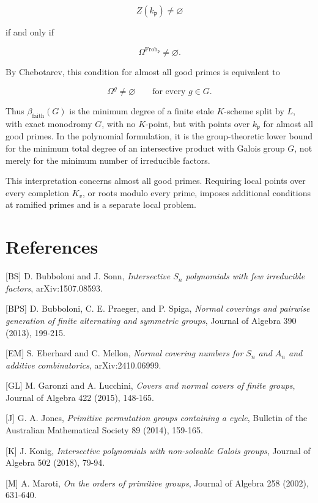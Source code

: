 \documentclass[11pt]{article}
\begin{document}
\[
Z(k_{\mathfrak p})\ne\varnothing
\]

if and only if

\[
\Omega^{\operatorname{Frob}_{\mathfrak p}}\ne\varnothing.
\]

By Chebotarev, this condition for almost all good primes is equivalent to

\[
\Omega^g\ne\varnothing
\qquad
\text{for every }g\in G.
\]

Thus $\beta_{\mathrm{faith}}(G)$ is the minimum degree of a finite etale $K$-scheme split by $L$, with exact monodromy $G$, with no $K$-point, but with points over $k_{\mathfrak p}$ for almost all good primes. In the polynomial formulation, it is the group-theoretic lower bound for the minimum total degree of an intersective product with Galois group $G$, not merely for the minimum number of irreducible factors.

This interpretation concerns almost all good primes. Requiring local points over every completion $K_v$, or roots modulo every prime, imposes additional conditions at ramified primes and is a separate local problem.

\section*{References}
\small
\sloppy

[BS] D. Bubboloni and J. Sonn, \emph{Intersective $S_n$ polynomials with few irreducible factors}, arXiv:1507.08593.

[BPS] D. Bubboloni, C. E. Praeger, and P. Spiga, \emph{Normal coverings and pairwise generation of finite alternating and symmetric groups}, Journal of Algebra 390 (2013), 199-215.

[EM] S. Eberhard and C. Mellon, \emph{Normal covering numbers for $S_n$ and $A_n$ and additive combinatorics}, arXiv:2410.06999.

[GL] M. Garonzi and A. Lucchini, \emph{Covers and normal covers of finite groups}, Journal of Algebra 422 (2015), 148-165.

[J] G. A. Jones, \emph{Primitive permutation groups containing a cycle}, Bulletin of the Australian Mathematical Society 89 (2014), 159-165.

[K] J. Konig, \emph{Intersective polynomials with non-solvable Galois groups}, Journal of Algebra 502 (2018), 79-94.

[M] A. Maroti, \emph{On the orders of primitive groups}, Journal of Algebra 258 (2002), 631-640.
\end{document}
